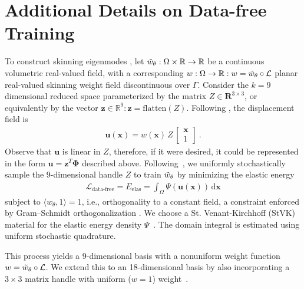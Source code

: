 \documentclass[acmtog, nonacm]{acmart}
\begin{document}
\section{Additional Details on Data-free Training}
\label{sec::appendix:training_details}
To construct skin\-ning eigen\-modes \cite{benchekroun2023FastComplemDynamics},
let $\Tilde{w}_\theta : \Omega \times \mathbb{R} \rightarrow \mathbb{R}$ be a continuous volumetric real-valued field, with a corresponding $w: \Omega \rightarrow \mathbb{R} : w = \Tilde{w}_\theta \circ \mathcal{L}$ planar real-valued skinning weight field discontinuous over $\Gamma$. Consider the $k=9$ dimensional reduced space parameterized by the matrix $Z \in \mathbf{R}^{3 \times 3}$, or equivalently by the vector $\bm{z} \in \mathbb{R}^{9} : \bm{z} = \textrm{flatten}(Z)$. Following \citet{benchekroun2023FastComplemDynamics}, the displacement field is 
\begin{align}
    \bm{u}(\bm{x}) = w(\bm{x}) \, Z\, \begin{bmatrix} \bm{x} \\ 1\end{bmatrix} \ .
\end{align}
Observe that $\bm{u}$ is linear in $Z$, therefore, if it were desired, it could be represented in the form $\bm{u} = \bm{z}^T \bm{\Phi}$ described above. Following~\citet{Modi:2024:Simplicits}, we uniformly stochastically sample the 9-dimensional handle $Z$ to train $\Tilde{w}_\theta$ by minimizing the elastic energy 
\begin{align} \label{eq:training-data-free}
    \mathcal{L}_{\text{data-free}} = E_{\text{elas}} = \int_{\Omega}\Psi(\bm{u}(\bm{x})) \, \mathrm{d}\bm{x} 
\end{align}
subject to $\langle w_\theta, 1 \rangle = 1$, i.e., orthogonality to a constant field, a constraint enforced by Gram–Schmidt orthogonalization \cite{chang2024neuralrepresentationshapedependentlaplacian}. We choose a St. Venant-Kirchhoff (StVK) material for the elastic energy density $\Psi$~\cite{barbivc2005real}. The domain integral is estimated using uniform stochastic quadrature. 

This process yields a 9-dimensional basis with a nonuniform weight function $w = \Tilde{w}_\theta \circ \mathcal{L}$. We extend this to an 18-dimensional basis by also incorporating a $3 \times 3$ matrix handle with uniform ($w=1$) weight~\cite{benchekroun2023FastComplemDynamics}.




\end{document}
